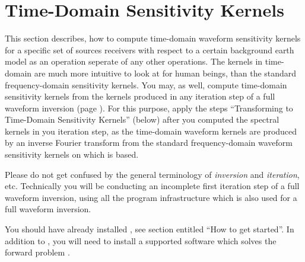 \section{Time-Domain Sensitivity Kernels} \label{guide,sec:time_kernels}
%
%
This section describes, how to compute time-domain waveform sensitivity kernels for a specific set 
of sources receivers with respect to a certain background earth model as an operation seperate of any
other \ASKI{} operations. The kernels in time-domain are much more intuitive to look at for human beings, 
than the standard frequency-domain sensitivity kernels. You may, as well, compute time-domain sensitivity 
kernels from the kernels produced in any iteration step of a full waveform inversion 
(page \pageref{guide,sec:classic_inversion}). For this purpose, apply the steps 
``Transforming to Time-Domain Sensitivity Kernels'' (below) after you computed the spectral kernels in 
you iteration step, as the time-domain waveform kernels are produced by an inverse Fourier transform 
from the standard frequency-domain waveform sensitivity kernels on which \ASKI{} is based.

Please do not get confused by the general terminology of \emph{inversion} and \emph{iteration}, etc. 
Technically you will be conducting an incomplete first iteration step of a full waveform inversion, 
using all the program infrastructure which is also used for a full waveform inversion. 

You should have already installed \ASKI{}, see section entitled ``How to get started''. 
In addition to \ASKI{}, you will need to install a supported software which 
solves the forward problem .
%
